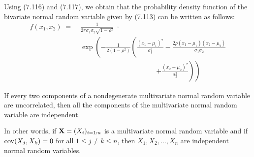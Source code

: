 Using (7.116) and (7.117), we obtain that the probability density function of the bivariate
normal random variable given by (7.113) can be written as follows:
\begin{equation}
\begin{split}
f(x_1,x_2) \;=\;& \frac{1}{2\pi\sigma_1\sigma_2\sqrt{1-\rho^2}}\;\cdot\\
&\exp\!\left(-\frac{1}{2(1-\rho^2)}\left(\frac{(x_1-\mu_1)^2}{\sigma_1^2} - \frac{2\rho(x_1-\mu_1)(x_2-\mu_2)}{\sigma_1\sigma_2}\right.\right.\\
&\qquad\qquad\qquad\qquad\qquad\quad \left.\left. + \frac{(x_2-\mu_2)^2}{\sigma_2^2}\right)\right)
\end{split}
\end{equation}

\begin{lemma}
If every two components of a nondegenerate multivariate normal random variable are
uncorrelated, then all the components of the multivariate normal random variable are
independent.

In other words, if $\mathbf{X} = (X_i)_{i=1:n}$ is a multivariate normal random variable and if
$\operatorname{cov}(X_j,X_k) = 0$ for all $1 \le j \neq k \le n$, then $X_1, X_2, \ldots, X_n$ are independent
normal random variables.
\end{lemma}

